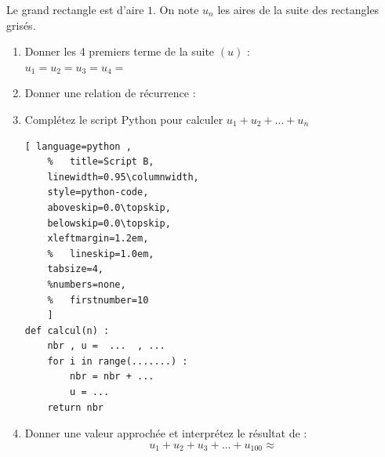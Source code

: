 \documentclass[main.tex]{subfiles}
\begin{document}
\begin{exercise}\label{chapter05:exercise:suites08}Le grand rectangle est d'aire $1$. On note $u_n$ les aires de la suite des rectangles grisés. 
	
\noindent
\begin{minipage}{0.62\linewidth} 

\begin{enumerate}[label=\arabic*),leftmargin=*]
	\item Donner les 4 premiers terme de la suite $(u)$ :\\
	$u_1=$\dotfill $u_2=$\dotfill $u_3=$\dotfill $u_4=$\dotfill 
	\item Donner une relation de récurrence :\dotfill 
	\item Complétez le script Python pour calculer $u_1+u_2+\ldots+u_n$ 
\begin{lstlisting}[ language=python , 
	%	title=Script B,   
	linewidth=0.95\columnwidth,
	style=python-code,    
	aboveskip=0.0\topskip,
	belowskip=0.0\topskip,
	xleftmargin=1.2em,
	%	lineskip=1.0em,
	tabsize=4, 
	%numbers=none,
	%	firstnumber=10  
	] 
def calcul(n) :
	nbr , u =  ...  , ...
	for i in range(.......) :
		nbr = nbr + ...
		u = ...
	return nbr
\end{lstlisting}
	\item Donner une valeur approchée et interprétez le résultat de : 
	\setlength{\abovedisplayskip}{3pt}
	\setlength{\belowdisplayskip}{3pt}
	$$u_1+u_2+u_3+\ldots +u_{100}\approx $$
\end{enumerate}	 
\end{minipage} 
\hfill 
\begin{minipage}{0.35\linewidth} \centering
{}
\end{minipage}
\end{exercise}
\end{document}
